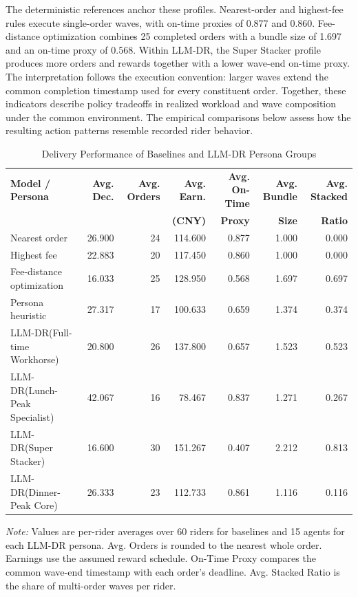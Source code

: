 \documentclass[letterpaper,journal]{IEEEtran}
\begin{document}
The deterministic references anchor these profiles. Nearest-order and highest-fee rules execute single-order waves, with on-time proxies of 0.877 and 0.860. Fee-distance optimization combines 25 completed orders with a bundle size of 1.697 and an on-time proxy of 0.568. Within LLM-DR, the Super Stacker profile produces more orders and rewards together with a lower wave-end on-time proxy. The interpretation follows the execution convention: larger waves extend the common completion timestamp used for every constituent order. Together, these indicators describe policy tradeoffs in realized workload and wave composition under the common environment. The empirical comparisons below assess how the resulting action patterns resemble recorded rider behavior.

\begin{table}[!t]
\caption{Delivery Performance of Baselines and LLM-DR Persona Groups}
\label{tab:main_results}
\centering
\scriptsize
\setlength{\tabcolsep}{3pt}
\begin{tabular*}{0.70\textwidth}{@{\extracolsep{\fill}}lrrrrrr@{}}
\toprule
\textbf{Model / Persona} & \textbf{Avg. Dec.} & \textbf{Avg. Orders} & \textbf{Avg. Earn.} & \textbf{Avg. On-Time} & \textbf{Avg. Bundle} & \textbf{Avg. Stacked} \\
 &  &  & \textbf{(CNY)} & \textbf{Proxy} & \textbf{Size} & \textbf{Ratio} \\
\midrule
Nearest order & 26.900 & 24 & 114.600 & 0.877 & 1.000 & 0.000 \\
Highest fee & 22.883 & 20 & 117.450 & 0.860 & 1.000 & 0.000 \\
Fee-distance optimization & 16.033 & 25 & 128.950 & 0.568 & 1.697 & 0.697 \\
Persona heuristic & 27.317 & 17 & 100.633 & 0.659 & 1.374 & 0.374 \\
\midrule
LLM-DR(Full-time Workhorse) & 20.800 & 26 & 137.800 & 0.657 & 1.523 & 0.523 \\
LLM-DR(Lunch-Peak Specialist) & 42.067 & 16 & 78.467 & 0.837 & 1.271 & 0.267 \\
LLM-DR(Super Stacker) & 16.600 & 30 & 151.267 & 0.407 & 2.212 & 0.813 \\
LLM-DR(Dinner-Peak Core) & 26.333 & 23 & 112.733 & 0.861 & 1.116 & 0.116 \\
\bottomrule
\end{tabular*}
\par\vspace{1.5mm}
\begin{minipage}{0.70\textwidth}
\scriptsize
\raggedright
\emph{Note:} Values are per-rider averages over 60 riders for baselines and 15 agents for each LLM-DR persona. Avg. Orders is rounded to the nearest whole order. Earnings use the assumed reward schedule. On-Time Proxy compares the common wave-end timestamp with each order's deadline. Avg. Stacked Ratio is the share of multi-order waves per rider.
\end{minipage}
\end{table}
\end{document}

